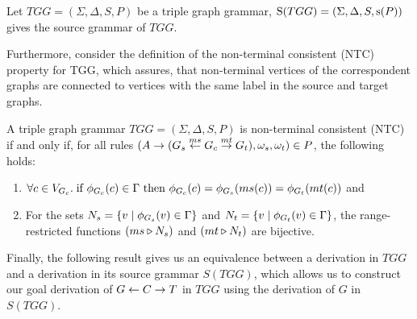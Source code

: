 \documentclass[runningheads]{llncs}
\begin{document}
\begin{definition}
	\label{def:Source}
	Let $TGG = (\Sigma, \Delta, S, P)$ be a triple graph grammar, $\Source(TGG) = (\Sigma, \Delta, S, \source(P))$ gives the source grammar of $TGG$.
\end{definition}

Furthermore, consider the definition of the non-terminal consistent (NTC) property for TGG, which assures, that non-terminal vertices of the correspondent graphs are connected to vertices with the same label in the source and target graphs.

\begin{definition}
	A triple graph grammar $TGG = (\Sigma, \Delta, S, P)$ is non-terminal consistent (NTC) if and only if, for all rules $(A \pro (G_s \ms{ms} G_c \mt{mt} G_t), \omega_s, \omega_t) \in P$, the following holds:
	\begin{enumerate}
		\item $\forall c \in V_{G_c} \. \text{if } \phi_{G_c}(c) \in \Gamma \text{ then } \phi_{G_c}(c) = \phi_{G_s}(ms(c)) = \phi_{G_t}(mt(c))$ and
		\item For the sets $N_s = \{v \st \phi_{G_s}(v) \in \Gamma\}$ and $N_t = \{v \st \phi_{G_t}(v) \in \Gamma\}$, the range-restricted functions $(ms \rrestr N_s)$ and $(mt \rrestr N_t)$ are bijective.
	\end{enumerate}
\end{definition}

Finally, the following result gives us an equivalence between a derivation in $TGG$ and a derivation in its source grammar $S(TGG)$, which allows us to construct our goal derivation of $G \ms{} C \mt{} T$ in $TGG$ using the derivation of $G$ in $S(TGG)$.
\end{document}
